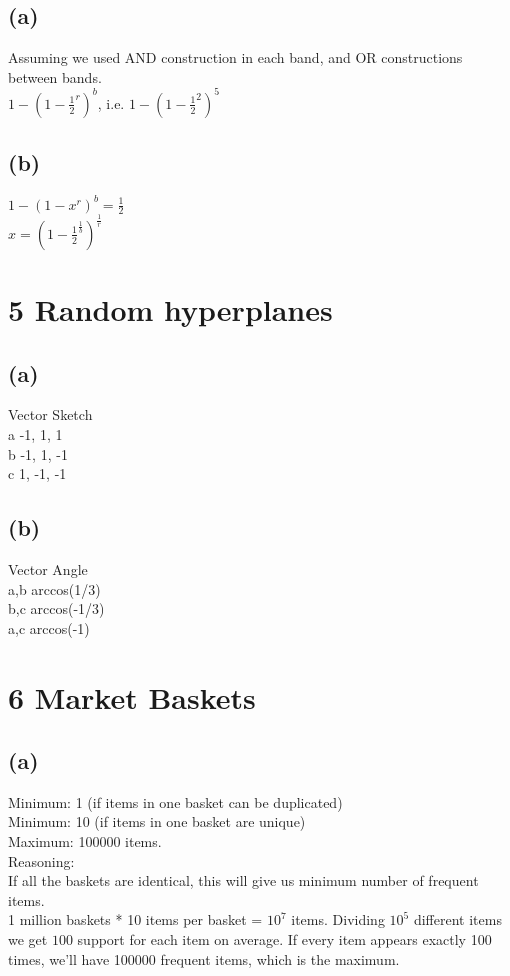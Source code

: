 \documentclass{article}
\begin{document}
\subsection{(a)}
Assuming we used AND construction in each band, and OR constructions between bands. \\
$1 - (1-\frac{1}{2}^r)^b$, i.e. $1 - (1-\frac{1}{2}^2)^5$

\subsection{(b)}
$1 - (1-x^r)^b = \frac{1}{2}$ \\
$x = (1 - \frac{1}{2}^\frac{1}{b})^\frac{1}{r}$

\section{5 Random hyperplanes}
\subsection{(a)}
Vector    Sketch \\
a           -1, 1, 1 \\
b           -1, 1, -1 \\
c          1, -1, -1 \\

\subsection{(b)}
Vector    Angle \\
a,b         arccos(1/3) \\
b,c         arccos(-1/3) \\
a,c         arccos(-1) \\

\section{6 Market Baskets}
\subsection{(a)}
Minimum: 1 (if items in one basket can be duplicated) \\
Minimum: 10 (if items in one basket are unique) \\
Maximum: 100000 items. \\

Reasoning: \\
If all the baskets are identical, this will give us minimum number of frequent items. \\
1 million baskets * 10 items per basket = $10^7$ items. Dividing $10^5$ different items we get $100$ support for each item on average. If every item appears exactly 100 times, we'll have 100000 frequent items, which is the maximum.
\end{document}
